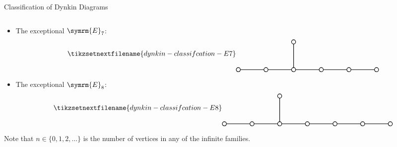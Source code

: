 \documentclass[fleqn]{NotesClass}
\newcommand{\dynkin}[2]{\symrm{#1}_{#2}}
\begin{document}
\begin{thm}{Classification of Dynkin Diagrams}{}
\begin{itemize}
\begin{equation*}
            \end{equation*}
            \item The exceptional \(\dynkin{E}{7}\):
            \begin{equation*}
                \tikzsetnextfilename{dynkin-classifcation-E7}
                \begin{tikzpicture}[baseline=(current bounding box), scale=0.7]
                    \draw[thick] (0, 0) -- (10, 0);
                    \draw[thick] (4, 0) -- (4, 2);
                    \draw[thick, fill=white] (0, 0) circle [radius=0.15];
                    \draw[thick, fill=white] (2, 0) circle [radius=0.15];
                    \draw[thick, fill=white] (4, 0) circle [radius=0.15];
                    \draw[thick, fill=white] (6, 0) circle [radius=0.15];
                    \draw[thick, fill=white] (8, 0) circle [radius=0.15];
                    \draw[thick, fill=white] (10, 0) circle [radius=0.15];
                    \draw[thick, fill=white] (4, 2) circle [radius=0.15];
                \end{tikzpicture}
            \end{equation*}
            \item The exceptional \(\dynkin{E}{8}\):
            \begin{equation*}
                \tikzsetnextfilename{dynkin-classifcation-E8}
                \begin{tikzpicture}[baseline=(current bounding box), scale=0.7]
                    \draw[thick] (0, 0) -- (12, 0);
                    \draw[thick] (4, 0) -- (4, 2);
                    \draw[thick, fill=white] (0, 0) circle [radius=0.15];
                    \draw[thick, fill=white] (2, 0) circle [radius=0.15];
                    \draw[thick, fill=white] (4, 0) circle [radius=0.15];
                    \draw[thick, fill=white] (6, 0) circle [radius=0.15];
                    \draw[thick, fill=white] (8, 0) circle [radius=0.15];
                    \draw[thick, fill=white] (10, 0) circle [radius=0.15];
                    \draw[thick, fill=white] (12, 0) circle [radius=0.15];
                    \draw[thick, fill=white] (4, 2) circle [radius=0.15];
                \end{tikzpicture}
            \end{equation*}
        \end{itemize}
        Note that \(n \in \{0, 1, 2, \dotsc\}\) is the number of vertices in any of the infinite families.
    \end{thm}
    
\end{document}
